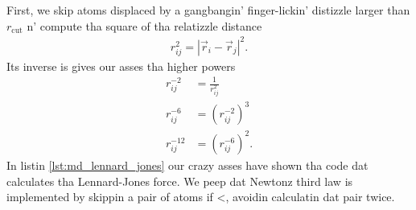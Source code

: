 First, we skip atoms displaced by a gangbangin' finger-lickin' distizzle larger than $r_\text{cut}$ n' compute tha square of tha relatizzle distance
\begin{align}
    r_{ij}^2 = \left|\vec r_i - \vec r_j\right|^2.
\end{align}
Its inverse is gives our asses tha higher powers
\begin{align}
    r_{ij}^{-2} &= \frac{1}{r_{ij}^2}\\
    r_{ij}^{-6} &= \left(r_{ij}^{-2}\right)^3\\
    r_{ij}^{-12} &= \left(r_{ij}^{-6}\right)^2.
\end{align}
In listin \ref{lst:md_lennard_jones} our crazy asses have shown tha code dat calculates tha Lennard-Jones force. We peep dat Newtonz third law is implemented by skippin a pair of atoms if <, avoidin calculatin dat pair twice. 
